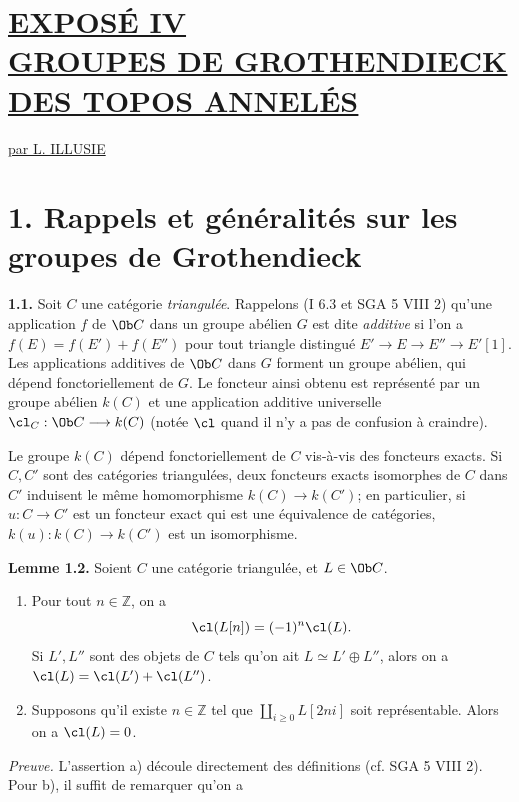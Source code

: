 \section*{\underline{EXPOSÉ IV}\\[3pt] \underline{\underline{GROUPES DE GROTHENDIECK DES TOPOS ANNELÉS}}}
\renewcommand{\parf}{\underline{\mathrm{parf}}}
\begin{center}
\underline{par L. ILLUSIE}
\end{center}

\section*{1. Rappels et généralités sur les groupes de Grothendieck}

\textbf{1.1.} Soit \(C\) une catégorie \emph{triangulée}. Rappelons (I 6.3 et SGA 5 VIII 2) qu'une application \(f\) de \(\Ob C\) dans un groupe abélien \(G\) est dite \emph{additive} si l'on a \(f(E)=f(E')+f(E'')\) pour tout triangle distingué \(E'\longrightarrow E\longrightarrow E''\longrightarrow E'[1]\). Les applications additives de \(\Ob C\) dans \(G\) forment un groupe abélien, qui dépend fonctoriellement de \(G\). Le foncteur ainsi obtenu est représenté par un groupe abélien \(k(C)\) et une application additive universelle \(\cl_C:\Ob C\longrightarrow k(C)\) (notée \(\cl\) quand il n'y a pas de confusion à craindre).

Le groupe \(k(C)\) dépend fonctoriellement de \(C\) vis-à-vis des foncteurs exacts. Si \(C,C'\) sont des catégories triangulées, deux foncteurs exacts isomorphes de \(C\) dans \(C'\) induisent le même homomorphisme \(k(C)\to k(C')\); en particulier, si \(u:C\to C'\) est un foncteur exact qui est une équivalence de catégories, \(k(u):k(C)\to k(C')\) est un isomorphisme.

\textbf{Lemme 1.2.} Soient \(C\) une catégorie triangulée, et \(L\in\Ob C\).
\begin{enumerate}[label=\alph*)]
\item Pour tout \(n\in\mathbb Z\), on a
\[
 \cl(L[n])=(-1)^n\cl(L).
\]
Si \(L',L''\) sont des objets de \(C\) tels qu'on ait \(L\simeq L'\oplus L''\), alors on a \(\cl(L)=\cl(L')+\cl(L'')\).
\item Supposons qu'il existe \(n\in\mathbb Z\) tel que \(\coprod_{i\geq0} L[2ni]\) soit représentable. Alors on a \(\cl(L)=0\).
\end{enumerate}

\emph{Preuve.} L'assertion a) découle directement des définitions (cf. SGA 5 VIII 2). Pour b), il suffit de
remarquer qu'on a
